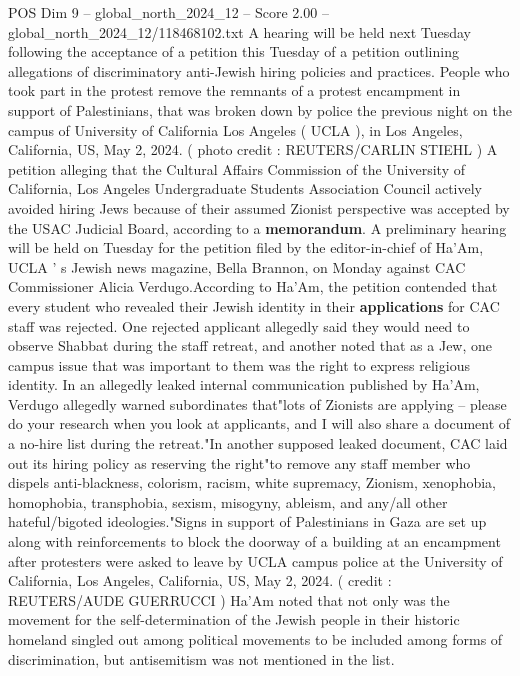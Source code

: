\begin{textsample}{POS Dim 9 – global\_north\_2024\_12 – Score 2.00 – global\_north\_2024\_12/118468102.txt}  \label{ex:f9_pos_327}
A hearing will be held next Tuesday following the acceptance of a petition this Tuesday of a petition outlining allegations of discriminatory anti-Jewish hiring policies and practices.
People who took part in the protest remove the remnants of a protest encampment in support of Palestinians, that was broken down by police the previous night on the campus of University of California Los Angeles ( UCLA ), in Los Angeles, California, US, May 2, 2024. ( photo credit : REUTERS/CARLIN STIEHL ) A petition alleging that the Cultural Affairs Commission of the University of California, Los Angeles Undergraduate Students Association Council actively avoided hiring Jews because of their assumed Zionist perspective was accepted by the USAC Judicial Board, according to a \textbf{memorandum}.
A preliminary hearing will be held on Tuesday for the petition filed by the editor-in-chief of Ha'Am, UCLA ' s Jewish news magazine, Bella Brannon, on Monday against CAC Commissioner Alicia Verdugo.According to Ha'Am, the petition contended that every student who revealed their Jewish identity in their \textbf{applications} for CAC staff was rejected.
One rejected applicant allegedly said they would need to observe Shabbat during the staff retreat, and another noted that as a Jew, one campus issue that was important to them was the right to express religious identity.
In an allegedly leaked internal communication published by Ha'Am, Verdugo allegedly warned subordinates that"lots of Zionists are applying -- please do your research when you look at applicants, and I will also share a document of a no-hire list during the retreat."In another supposed leaked document, CAC laid out its hiring policy as reserving the right"to remove any staff member who dispels anti-blackness, colorism, racism, white supremacy, Zionism, xenophobia, homophobia, transphobia, sexism, misogyny, ableism, and any/all other hateful/bigoted ideologies."Signs in support of Palestinians in Gaza are set up along with reinforcements to block the doorway of a building at an encampment after protesters were asked to leave by UCLA campus police at the University of California, Los Angeles, California, US, May 2, 2024. ( credit : REUTERS/AUDE GUERRUCCI ) Ha'Am noted that not only was the movement for the self-determination of the Jewish people in their historic homeland singled out among political movements to be included among forms of discrimination, but antisemitism was not mentioned in the list.

\end{textsample}
